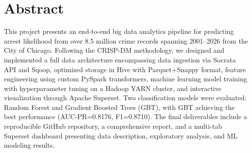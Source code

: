 \section*{Abstract}

This project presents an end-to-end big data analytics pipeline for predicting arrest likelihood from over 8.5 million crime records spanning 2001--2026 from the City of Chicago. Following the CRISP-DM methodology, we designed and implemented a full data architecture encompassing data ingestion via Socrata API and Sqoop, optimized storage in Hive with Parquet+Snappy format, feature engineering using custom PySpark transformers, machine learning model training with hyperparameter tuning on a Hadoop YARN cluster, and interactive visualization through Apache Superset. Two classification models were evaluated: Random Forest and Gradient Boosted Trees (GBT), with GBT achieving the best performance (AUC-PR=0.8176, F1=0.8710). The final deliverables include a reproducible GitHub repository, a comprehensive report, and a multi-tab Superset dashboard presenting data description, exploratory analysis, and ML modeling results.
